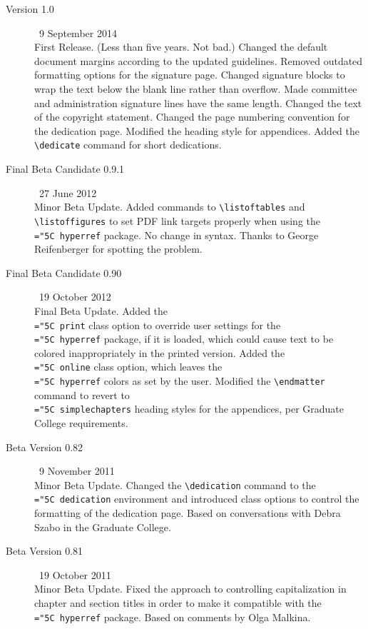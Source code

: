\documentclass[11pt]{article}
\newcommand\code[1]{{\normalfont\texttt{\let\dv\textsl\chardef\\="5C #1}}}
\begin{document}
\begin{description}
\item[Version 1.0] \dotfill\ 9 September 2014\\
First Release.  (Less than five years.  Not bad.)
Changed the default document margins according to the updated guidelines.  Removed outdated formatting options for the signature page.  Changed signature blocks to wrap the text below the blank line rather than overflow.  Made committee and administration signature lines have the same length.  Changed the text of the copyright statement.  Changed the page numbering convention for the dedication page.  Modified the heading style for appendices.  Added the \verb=\dedicate= command for short dedications.

\item[Final Beta Candidate 0.9.1] \dotfill\ 27 June 2012\\
Minor Beta Update.  
Added commands to \verb=\listoftables= and \verb=\listoffigures= to set PDF link targets properly when using the \code{hyperref} package.  No change in syntax.  Thanks to George Reifenberger for spotting the problem.

\item[Final Beta Candidate 0.90] \dotfill\ 19 October 2012\\
Final Beta Update.  
Added the \code{print} class option to override user settings for the \code{hyperref} package, if it is loaded, which could cause text to be colored inappropriately in the printed version.  Added the \code{online} class option, which leaves the \code{hyperref} colors as set by the user.  Modified the \verb=\endmatter= command to revert to \code{simplechapters} heading styles for the appendices, per Graduate College requirements.

\item[Beta Version 0.82] \dotfill\ 9 November 2011\\
Minor Beta Update.  Changed the \verb=\dedication= command to the \code{dedication} environment and introduced class options to control the formatting of the dedication page.  Based on conversations with Debra Szabo in the Graduate College.

\item[Beta Version 0.81] \dotfill\ 19 October 2011\\
Minor Beta Update.  Fixed the approach to controlling capitalization in chapter and section titles in order to make it compatible with the \code{hyperref} package.  Based on comments by Olga Malkina.


\end{description}
\end{document}
